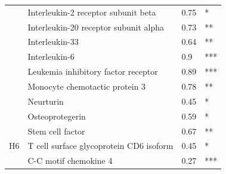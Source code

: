 \begin{table}[ht]
{\begin{tabular}{clll}
                                           & \cellcolor[HTML]{EFEFEF}Interleukin-2 receptor subunit beta                 & \cellcolor[HTML]{EFEFEF}0.75       & \cellcolor[HTML]{EFEFEF}*               \\
                                           & \cellcolor[HTML]{EFEFEF}Interleukin-20 receptor subunit alpha               & \cellcolor[HTML]{EFEFEF}0.73       & \cellcolor[HTML]{EFEFEF}**              \\
                                           & Interleukin-33                                                              & 0.64                               & **                                      \\
                                           & Interleukin-6                                                               & 0.9                                & ***                                     \\
                                           & Leukemia inhibitory factor receptor                                         & 0.89                               & ***                                     \\
                                           & Monocyte chemotactic protein 3                                              & 0.78                               & **                                      \\
                                           & \cellcolor[HTML]{EFEFEF}Neurturin                                           & \cellcolor[HTML]{EFEFEF}0.45       & \cellcolor[HTML]{EFEFEF}*               \\
                                           & \cellcolor[HTML]{EFEFEF}Osteoprotegerin                                     & \cellcolor[HTML]{EFEFEF}0.59       & \cellcolor[HTML]{EFEFEF}*               \\
                                           & \cellcolor[HTML]{EFEFEF}Stem cell factor                                    & \cellcolor[HTML]{EFEFEF}0.67       & \cellcolor[HTML]{EFEFEF}**              \\
\multirow{-17}{*}{H6}                      & \cellcolor[HTML]{EFEFEF}T cell surface glycoprotein CD6 isoform             & \cellcolor[HTML]{EFEFEF}0.45       & \cellcolor[HTML]{EFEFEF}*               \\ \hline
                                           & C-C motif chemokine 4                                                       & 0.27                               & ***                                     \\

\end{tabular}}
\end{table}
